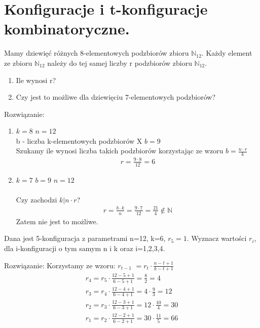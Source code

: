\documentclass[main.tex]{subfiles}
\begin{document}
    \section{Konfiguracje i t-konfiguracje kombinatoryczne.}

    \begin{exercise}
        Mamy dziewięć różnych 8-elementowych podzbiorów zbioru $\mathbb{N}_{12}$. Każdy element ze zbioru $\mathbb{N}_{12}$ należy do tej samej liczby r podzbiorów zbioru $\mathbb{N}_{12}$.
        \begin{enumerate}
            \item Ile wynosi r?
            \item Czy jest to możliwe dla dziewięciu 7-elementowych podzbiorów?
        \end{enumerate}
    \end{exercise}
    Rozwiązanie:
    \begin{enumerate}
        \item $k = 8$ \quad $n = 12$\\
        b - liczba k-elementowych podzbiorów X
        $b = 9$ \\
        Szukamy ile wynosi liczba takich podzbiorów korzystając ze wzoru $b=\frac{n\cdot r}{k}$
        \begin{align*}
            r=\frac{9 \cdot 8}{12} = 6
        \end{align*}
        \item $k = 7$ \quad $b=9$ \quad $n=12$\\\\
        Czy zachodzi $k|n \cdot r$?
        \begin{align*}
            r=\frac{b \cdot k}{n} = \frac{9 \cdot 7}{12} = \frac{21}{4} \notin \mathbb{N}
        \end{align*}
        Zatem nie jest to możliwe.
    \end{enumerate}


    \begin{exercise}
        Dana jest 5-konfiguracja z parametrami n=12, k=6, $r_5=1$. Wyznacz wartości $r_i$, dla i-konfiguracji o tym samym n i k oraz i=1,2,3,4.
    \end{exercise}
    Rozwiązanie:
    Korzystamy ze wzoru: $r_{t-1}$ $= r_t \cdot \frac{n-t+1}{k-t+1}$
    \begin{align*}
        r_4 = r_5\cdot \frac{12-5+1}{6-5+1} = \frac{8}{2} = 4 \\
        r_3 = r_4\cdot \frac{12-4+1}{6-4+1} = 4 \cdot \frac{9}{3} = 12 \\
        r_2 = r_3\cdot \frac{12-3+1}{6-3+1} = 12 \cdot \frac{10}{4} = 30 \\
        r_1 = r_2\cdot \frac{12-2+1}{6-2+1} = 30 \cdot \frac{11}{5} = 66 \\
    \end{align*}
\end{document}
